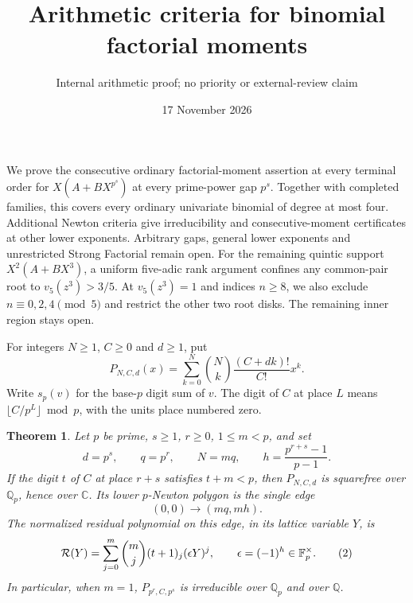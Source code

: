 \documentclass[11pt]{article}
\title{Arithmetic criteria for binomial factorial moments}
\author{Internal arithmetic proof; no priority or external-review claim}
\date{17 November 2026}
\newtheorem{theorem}{Theorem}
\begin{document}
\maketitle
We prove the consecutive ordinary factorial-moment assertion at every
terminal order for $X(A+BX^{p^s})$ at every prime-power gap $p^s$. Together with
completed families, this covers every ordinary univariate binomial of
degree at most four. Additional Newton criteria give irreducibility
and consecutive-moment certificates at other lower exponents. Arbitrary gaps,
general lower exponents and unrestricted Strong Factorial remain open.
For the remaining quintic support $X^2(A+BX^3)$, a uniform
five-adic rank argument confines any common-pair root to
$v_5(z^3)>3/5$. At $v_5(z^3)=1$ and indices $n\ge8$, we also
exclude $n\equiv0,2,4\pmod5$ and restrict the other two root disks.
The remaining inner region stays open.

For integers $N\ge1$, $C\ge0$ and $d\ge1$, put
\[
 P_{N,C,d}(x)=\sum_{k=0}^N\binom Nk\frac{(C+dk)!}{C!}x^k.
                                                               \tag{1}
\]
Write $s_p(v)$ for the base-$p$ digit sum of $v$.
The digit of $C$ at place $L$ means
$\lfloor C/p^L\rfloor\bmod p$, with the units place numbered zero.

\begin{theorem}\label{thm:main}
Let $p$ be prime, $s\ge1$, $r\ge0$, $1\le m<p$, and set
\[
 d=p^s,\qquad q=p^r,\qquad N=mq,\qquad
 h=\frac{p^{r+s}-1}{p-1}.
\]
If the digit $t$ of $C$ at place $r+s$ satisfies $t+m<p$, then
$P_{N,C,d}$ is squarefree over $\mathbb Q_p$, hence over $\mathbb C$.
Its lower $p$-Newton polygon is the single edge
\[
 (0,0)\longrightarrow(mq,mh).
\]
The normalized residual polynomial on this edge, in its lattice
variable $Y$, is
\[
 {\cal R}(Y)=\sum_{j=0}^m\binom mj(t+1)_j(\epsilon Y)^j,
 \qquad \epsilon=(-1)^h\in\mathbb F_p^\times.                 \tag{2}
\]
In particular, when $m=1$, $P_{p^r,C,p^s}$ is irreducible over
$\mathbb Q_p$ and over $\mathbb Q$.
\end{theorem}
\end{document}
